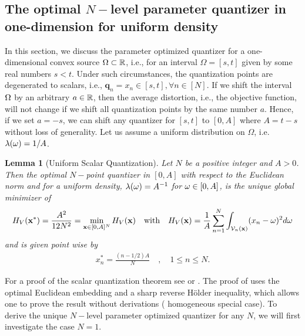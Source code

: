 \documentclass[12pt,onecolumn,journal,draftclsnofoot,letterpaper]{IEEEtran}
\newtheorem{lemma}{Lemma}
\renewcommand{\vp}{\mathbf q}
\newcommand{\df}{\ensuremath{\lam}}         %
\newcommand{\Vor}{\ensuremath{\mathcal{V}}}         %
\begin{document}
\fi %

\subsection{The optimal $N-$level parameter quantizer in one-dimension for uniform density}

In this section, we discuss the parameter optimized quantizer for a one-dimensional convex source $\Omega\subset{\ensuremath{\mathbb R}}$, i.e.,
for an interval $\Omega = [s,t]$ given by some real numbers $s<t$.  Under such circumstances, the quantization points are degenerated to scalars, i.e.,
$\vp_n=x_n\in[s, t], \forall n\in[N]$. If we shift the interval $\Omega$ by an arbitrary $a\in{\ensuremath{\mathbb R}}$, then the average distortion, i.e., the objective function, will not change if we shift all quantization points
by the same number $a$. Hence, if we set $a=-s$, we can shift any quantizer for $[s,t]$ to $[0,A]$ where $A=t-s$ without
loss of generality.
%
Let us assume a uniform distribution on $\Omega$, i.e.  $\df(\ome)=1/A$. 
%
%
\begin{lemma}[Uniform Scalar Quantization]\label{lem:UniformScalarQuantizer}
  Let $N$ be a positive integer and $A>0$. Then the optimal $N-$point quantizer in $[0,A]$ with respect to the
  Euclidean norm and for a uniform density, $\lambda(\omega)=A^{-1}$ for $\omega\in[0,A]$,  is the unique global minimizer of
  \begin{align}
    H_V(\vx^*)=\frac{A^2}{12N^2}=\min_{\vx\in[0,A]^N} H_V(\vx) 
       \quad\text{with}\quad H_V(\vx)=\frac{1}{A}\sum_{n=1}^N \int_{\Vor_n(\vx)} (x_n-\ome)^2d\ome
  \end{align}
  and is given point wise by
  \begin{align}
    x_n^*= \frac{(n-1/2)A}{N} \quad, \quad 1\leq n\leq N.
  \end{align}
\end{lemma}
%
For a proof of the scalar quantization theorem see \cite{GN98} or \cite{Erdem}.  The proof of \cite[Thm.1]{Erdem} uses
the optimal Euclidean  embedding and a sharp reverse Hölder inequality, which allows one to prove the result without
derivations ( homogeneous special case).  
\fi
%
To derive the unique $N-$level parameter optimized quantizer for any $N$, we will first investigate the case $N=1$.
%
\end{document}
